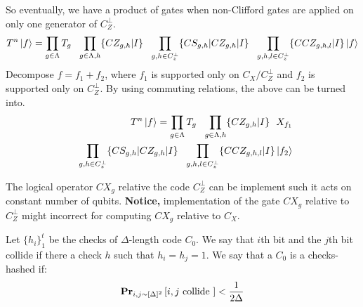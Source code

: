 \documentclass[manuscript,screen,review]{acmart}
\begin{document}
So eventually, we have a product of gates when non-Clifford gates are applied on only one generator of $C_{Z}^{\perp}$.
\begin{equation*}
  \begin{split}
    T^{n}\ket{f} = \prod_{g \in \Lambda} T_{g} \ \ \prod_{g \in \Lambda, h} \{ CZ_{g,h} | I \} \ \ \prod_{g ,h \in C_{z}^{\perp}} \{ CS_{g,h} | CZ_{g,h} | I \} \ \ \prod_{g ,h, l \in C_{z}^{\perp}} \{ CCZ_{g,h,l} | I \} \ket{f}
  \end{split}
\end{equation*}
Decompose $f = f_{1} + f_{2}$, where $f_{1}$ is supported only on $C_{X}/C^{\perp}_{Z}$ and $f_{2}$ is supported only on $C_{Z}^{\perp}$. By using commuting relations, the above can be turned into.
\begin{equation*}
  \begin{split}
    T^{n}\ket{f} = \prod_{g \in \Lambda} T_{g} \ \ \prod_{g \in \Lambda, h} \{ CZ_{g,h} | I \} \ \ X_{f_{1}} \\ \ \ \prod_{g ,h \in C_{z}^{\perp}} \{ CS_{g,h} | CZ_{g,h} | I \} \ \ \prod_{g ,h, l \in C_{z}^{\perp}} \{ CCZ_{g,h,l} | I \} \ket{f_2}
  \end{split}
\end{equation*}
\begin{claim}
  The logical operator $CX_{g}$ relative the code $C_{Z}^{\perp}$ can be implement such it acts on constant number of qubits. \textbf{Notice,} implementation of the gate $CX_{g}$ relative to $C_{Z}^{\perp}$ might incorrect for computing $CX_{g}$ relative to $C_{X}$. 
\end{claim}

\ifdefined\MORE


\newcommand{\hashcode}{ checks-hashed }



\begin{definition}
  Let $\{h_{i} \}_{1}^{t}$ be the checks of $\Delta$-length code $C_{0}$. We say that $i$th bit and the $j$th bit collide if there a check $h$ such that $h_{i}=h_{j}=1$. We say that a $C_{0}$ is a \hashcode if:  
  \begin{equation*}
    \begin{split}
      \prbm{ i,j \text{ collide  }  }{ i, j \sim [\Delta]^{2} } < \frac{1}{2\Delta}
    \end{split}
  \end{equation*}
\end{definition}
\end{document}

